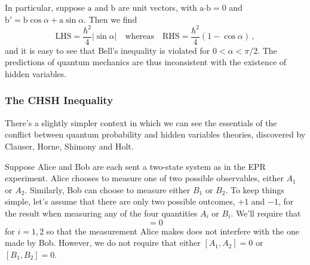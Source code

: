 \documentclass{article}
\theoremstyle{plain}\theoremheaderfont{\normalfont\itshape}\theorembodyfont{\rmfamily}\theoremseparator{.}\newtheorem*{rem}{Remark}\newtheorem*{ex}{Example}\newtheorem*{proof}{Proof}\newtheorem*{altp}{Alternative proof}
\theoremstyle{plain}\theoremheaderfont{\normalfont\bfseries}\theorembodyfont{\rmfamily}\theoremseparator{.}\newtheorem{thm}{Theorem}[section]\newtheorem{lem}[thm]{Lemma}\newtheorem{prop}[thm]{Proposition}\newtheorem*{cor}{Corollary}\newtheorem{defn}[thm]{Definition}\newtheorem{clm}[thm]{Claim}\newtheorem{clminproof}{Claim}
\theoremstyle{break}\theoremheaderfont{\normalfont\itshape}\theorembodyfont{\rmfamily}\theoremseparator{.\medskip}\newtheorem*{proofskip}{Proof}\newtheorem*{exs}{Examples}\newtheorem*{rems}{Remarks}
\theoremstyle{break}\theoremheaderfont{\normalfont\bfseries}\theorembodyfont{\rmfamily}\theoremseparator{.\medskip}\newtheorem{lemskip}[thm]{Lemma}\newtheorem{defnskip}[thm]{Definition}\newtheorem{propskip}[thm]{Proposition}\newtheorem{thmskip}[thm]{Theorem}
\numberwithin{equation}{section}
\newcommand{\vb}[1]{\bm{\mathrm{#1}}}
\newcommand{\vdot}{\bm{\cdot}}
\newcommand{\abs}[1]{\left| #1 \right|}
\begin{document}
    In particular, suppose \(\vb{a}\) and \(\vb{b}\) are unit vectors, with \(\vb{a}\vdot\vb{b}=0\) and \(\vb{b}'=\vb{b}\cos\alpha+\vb{a}\sin\alpha\). Then we find
    \begin{equation}
        \text{LHS}=\frac{\hbar^2}{4}\abs{\sin\alpha}\quad\text{whereas}\quad\text{RHS}=\frac{\hbar^2}{4}(1-\cos\alpha)\,,
    \end{equation}
    and it is easy to see that Bell's inequality is violated for \(0<\alpha<\pi/2\). The predictions of quantum mechanics are thus inconsistent with the existence of hidden variables.

    \subsubsection{The CHSH Inequality}
    There's a slightly simpler context in which we can see the essentials of the conflict between quantum probability and hidden variables theories, discovered by Clauser, Horne, Shimony and Holt.

    Suppose Alice and Bob are each sent a two-state system as in the EPR experiment. Alice chooses to measure one of two possible observables, either \(A_1\) or \(A_2\). Similarly, Bob can choose to measure either \(B_1\) or \(B_2\). To keep things simple, let's assume that there are only two possible outcomes, \(+1\) and \(-1\), for the result when measuring any of the four quantities \(A_i\) or \(B_i\). We'll require that
    \begin{equation}
        [A_i,B_j]=0
    \end{equation}
    for \(i=1,2\) so that the measurement Alice makes does not interfere with the one made by Bob. However, we do not require that either \([A_1,A_2]=0\) or \([B_1,B_2]=0\).
\end{document}
